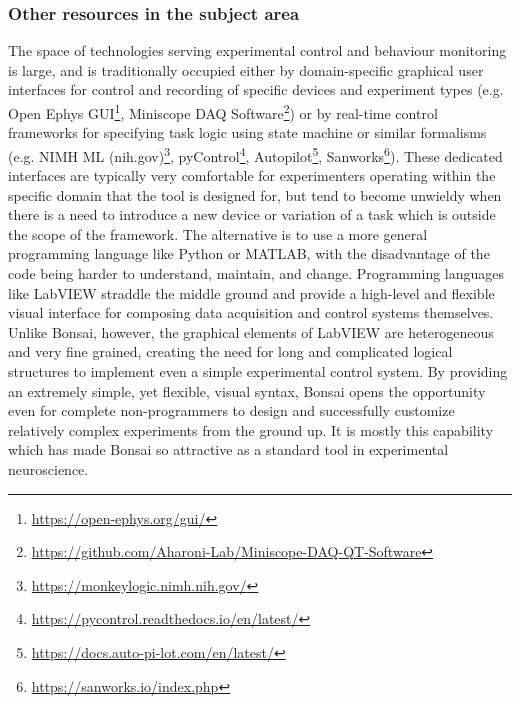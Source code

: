 \subsubsection*{Other resources in the subject area}

The space of technologies serving experimental control and behaviour monitoring
is large, and is traditionally occupied either by domain-specific graphical
user interfaces for control and recording of specific devices and experiment
types (e.g. Open Ephys
GUI\footnote{\href{https://open-ephys.org/gui/}{https://open-ephys.org/gui/}},
Miniscope DAQ
Software\footnote{\href{https://github.com/Aharoni-Lab/Miniscope-DAQ-QT-Software}{https://github.com/Aharoni-Lab/Miniscope-DAQ-QT-Software}})
or by real-time control frameworks for specifying task logic using state
machine or similar formalisms (e.g. NIMH ML
(nih.gov)\footnote{\href{https://monkeylogic.nimh.nih.gov/}{https://monkeylogic.nimh.nih.gov/}},
pyControl\footnote{\href{https://pycontrol.readthedocs.io/en/latest/}{https://pycontrol.readthedocs.io/en/latest/}},
Autopilot\footnote{\href{https://docs.auto-pi-lot.com/en/latest/}{https://docs.auto-pi-lot.com/en/latest/}},
Sanworks\footnote{\href{https://sanworks.io/index.php}{https://sanworks.io/index.php}}).
These dedicated interfaces are typically very comfortable for experimenters
operating within the specific domain that the tool is designed for, but tend to
become unwieldy when there is a need to introduce a new device or variation of
a task which is outside the scope of the framework. The alternative is to use a
more general programming language like Python or MATLAB, with the disadvantage
of the code being harder to understand, maintain, and change. Programming
languages like LabVIEW straddle the middle ground and provide a high-level and
flexible visual interface for composing data acquisition and control systems
themselves. Unlike Bonsai, however, the graphical elements of LabVIEW are
heterogeneous and very fine grained, creating the need for long and complicated
logical structures to implement even a simple experimental control system. By
providing an extremely simple, yet flexible, visual syntax, Bonsai opens the
opportunity even for complete non-programmers to design and successfully
customize relatively complex experiments from the ground up. It is mostly this
capability which has made Bonsai so attractive as a standard tool in
experimental neuroscience.


